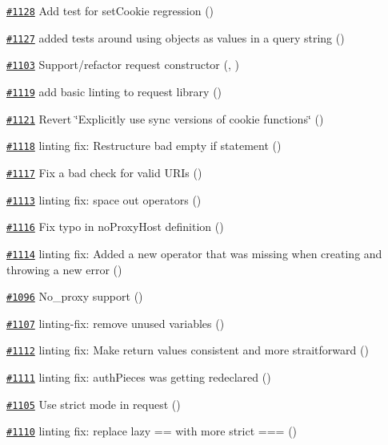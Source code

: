 \begin{DoxyItemize}
\item \href{https://github.com/request/request/pull/1128}{\tt \#1128} Add test for set\+Cookie regression ()
\item \href{https://github.com/request/request/pull/1127}{\tt \#1127} added tests around using objects as values in a query string ()
\item \href{https://github.com/request/request/pull/1103}{\tt \#1103} Support/refactor request constructor (, )
\item \href{https://github.com/request/request/pull/1119}{\tt \#1119} add basic linting to request library ()
\item \href{https://github.com/request/request/pull/1121}{\tt \#1121} Revert \char`\"{}\+Explicitly use sync versions of cookie functions\char`\"{} ()
\item \href{https://github.com/request/request/pull/1118}{\tt \#1118} linting fix\+: Restructure bad empty if statement ()
\item \href{https://github.com/request/request/pull/1117}{\tt \#1117} Fix a bad check for valid U\+R\+Is ()
\item \href{https://github.com/request/request/pull/1113}{\tt \#1113} linting fix\+: space out operators ()
\item \href{https://github.com/request/request/pull/1116}{\tt \#1116} Fix typo in {\ttfamily no\+Proxy\+Host} definition ()
\item \href{https://github.com/request/request/pull/1114}{\tt \#1114} linting fix\+: Added a {\ttfamily new} operator that was missing when creating and throwing a new error ()
\item \href{https://github.com/request/request/pull/1096}{\tt \#1096} No\+\_\+proxy support ()
\item \href{https://github.com/request/request/pull/1107}{\tt \#1107} linting-\/fix\+: remove unused variables ()
\item \href{https://github.com/request/request/pull/1112}{\tt \#1112} linting fix\+: Make return values consistent and more straitforward ()
\item \href{https://github.com/request/request/pull/1111}{\tt \#1111} linting fix\+: auth\+Pieces was getting redeclared ()
\item \href{https://github.com/request/request/pull/1105}{\tt \#1105} Use strict mode in request ()
\item \href{https://github.com/request/request/pull/1110}{\tt \#1110} linting fix\+: replace lazy \textquotesingle{}==\textquotesingle{} with more strict \textquotesingle{}===\textquotesingle{} ()

\end{DoxyItemize}
